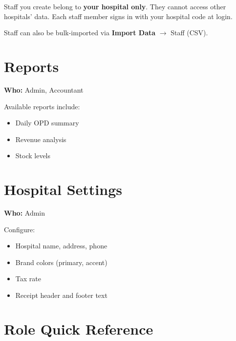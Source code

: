 \documentclass[11pt,a4paper]{report}
\begin{document}
\begin{warningbox}
Staff you create belong to \textbf{your hospital only}. They cannot access other hospitals' data. Each staff member signs in with your hospital code at login.
\end{warningbox}

Staff can also be bulk-imported via \textbf{Import Data} $\rightarrow$ Staff (CSV).

\chapter{Reports}

\textbf{Who:} Admin, Accountant

Available reports include:
\begin{itemize}[noitemsep]
    \item Daily OPD summary
    \item Revenue analysis
    \item Stock levels
\end{itemize}

\chapter{Hospital Settings}

\textbf{Who:} Admin

Configure:
\begin{itemize}[noitemsep]
    \item Hospital name, address, phone
    \item Brand colors (primary, accent)
    \item Tax rate
    \item Receipt header and footer text
\end{itemize}

\chapter{Role Quick Reference}
\end{document}
